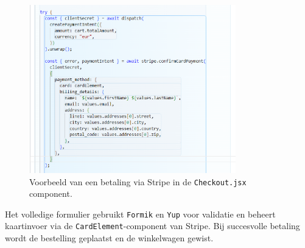 \begin{figure}[H]
  \centering
  \includegraphics[width=0.8\textwidth]{graphics/codeStripe.eps}
  \caption[Stripe-integratie in React Checkout-component]{\label{fig:stripe-checkout}Voorbeeld van een betaling via Stripe in de \texttt{Checkout.jsx} component.}
\end{figure}



Het volledige formulier gebruikt \texttt{Formik} en \texttt{Yup} voor validatie en beheert kaartinvoer via de \texttt{CardElement}-component van Stripe. Bij succesvolle betaling wordt de bestelling geplaatst en de winkelwagen gewist.

